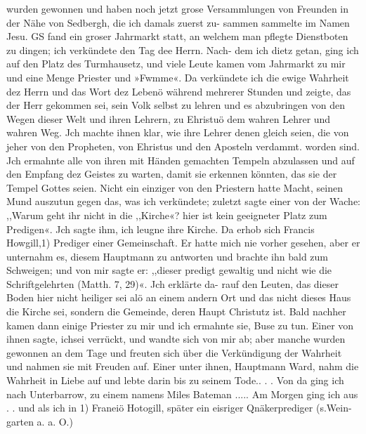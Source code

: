 wurden gewonnen und haben noch jetzt grose Versammlungen von
Freunden in der Nähe von Sedbergh, die ich damals zuerst zu-
sammen sammelte im Namen Jesu.
GS fand ein groser Jahrmarkt statt, an welchem man pflegte
Dienstboten zu dingen; ich verkündete den Tag dee Herrn. Nach-
dem ich dietz getan, ging ich auf den Platz des Turmhausetz, und
viele Leute kamen vom Jahrmarkt zu mir und eine Menge Priester
und »Fwmme«. Da verkündete ich die ewige Wahrheit dez
Herrn und das Wort dez Lebenö während mehrerer Stunden
und zeigte, das der Herr gekommen sei, sein Volk selbst zu lehren
und es abzubringen von den Wegen dieser Welt und ihren Lehrern,
zu Ehristuö dem wahren Lehrer und wahren Weg. Jch machte
ihnen klar, wie ihre Lehrer denen gleich seien, die von jeher
von den Propheten, von Ehristus und den Aposteln verdammt.
worden sind. Jch ermahnte alle von ihren mit Händen gemachten
Tempeln abzulassen und auf den Empfang dez Geistes zu warten,
damit sie erkennen könnten, das sie der Tempel Gottes seien.
Nicht ein einziger von den Priestern hatte Macht, seinen Mund
auszutun gegen das, was ich verkündete; zuletzt sagte einer von
der Wache: ,,Warum geht ihr nicht in die ,,Kirche«? hier ist
kein geeigneter Platz zum Predigen«. Jch sagte ihm, ich leugne
ihre Kirche. Da erhob sich Francis Howgill,1) Prediger einer
Gemeinschaft. Er hatte mich nie vorher gesehen, aber er unternahm
es, diesem Hauptmann zu antworten und brachte ihn bald zum
Schweigen; und von mir sagte er: ,,dieser predigt gewaltig und
nicht wie die Schriftgelehrten (Matth. 7, 29)«. Jch erklärte da-
rauf den Leuten, das dieser Boden hier nicht heiliger sei alö an
einem andern Ort und das nicht dieses Haus die Kirche sei,
sondern die Gemeinde, deren Haupt Christutz ist. Bald nachher
kamen dann einige Priester zu mir und ich ermahnte sie, Buse zu
tun. Einer von ihnen sagte, ichsei verrückt, und wandte sich von
mir ab; aber manche wurden gewonnen an dem Tage und freuten
sich über die Verkündigung der Wahrheit und nahmen sie mit
Freuden auf. Einer unter ihnen, Hauptmann Ward, nahm die
Wahrheit in Liebe auf und lebte darin bis zu seinem Tode.. . .
Von da ging ich nach Unterbarrow, zu einem namens Miles
Bateman ..... Am Morgen ging ich aus . . und als ich in
1) Franeiö Hotogill, später ein eisriger Qnäkerprediger (s.Wein-
garten a. a. O.)


